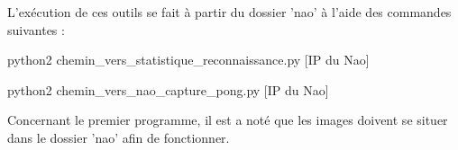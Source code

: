 \par L'exécution de ces outils se fait à partir du dossier 'nao' à l'aide des commandes suivantes :
\begin{center}
	{python2 chemin\_vers\_statistique\_reconnaissance.py [IP du Nao]}
\end{center}
\begin{center}
	{python2 chemin\_vers\_nao\_capture\_pong.py [IP du Nao]}
\end{center}

\par Concernant le premier programme, il est a noté que les images doivent se situer dans le dossier 'nao' afin de
fonctionner.
